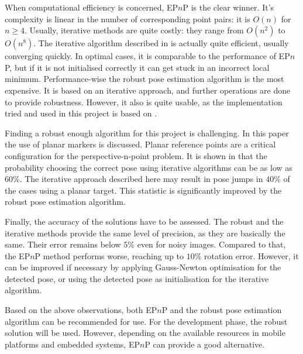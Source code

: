 When computational efficiency is concerned, EP$n$P is the clear winner.
It's complexity is linear in the number of corresponding point pairs: it is $O(n)$ for $n\geq4$.
Usually, iterative methods are quite costly: they range from $O(n^2)$ to $O(n^8)$.
The iterative algorithm described in \cite{iterative} is actually quite efficient, usually converging quickly.
In optimal cases, it is comparable to the performance of EP$n$P, but if it is not initialised correctly it can get stuck in an incorrect local minimum.
Performance-wise the robust pose estimation algorithm is the most expensive.
It is based on an iterative approach, and further operations are done to provide robustness.
However, it also is quite usable, as the implementation tried and used in this project is based on \cite{iterative}.

Finding a robust enough algorithm for this project is challenging.
In this paper the use of planar markers is discussed.
Planar reference points are a critical configuration for the perspective-n-point problem.
It is shown in \cite{robust} that the probability choosing the correct pose using iterative algorithms can be as low as $60\%$.
The iterative approach described here may result in pose jumps in $40\%$ of the cases using a planar target.
This statistic is significantly improved by the robust pose estimation algorithm.

Finally, the accuracy of the solutions have to be assessed.
The robust and the iterative methods provide the same level of precision, as they are basically the same.
Their error remains below $5\%$ even for noisy images.
Compared to that, the EP$n$P method performs worse, reaching up to $10\%$ rotation error.
However, it can be improved if necessary by applying Gauss-Newton optimisation for the detected pose, or using the detected pose as initialisation for the iterative algorithm.

Based on the above observations, both EP$n$P and the robust pose estimation algorithm can be recommended for use.
For the development phase, the robust solution will be used.
However, depending on the available resources in mobile platforms and embedded systems, EP$n$P can provide a good alternative.
